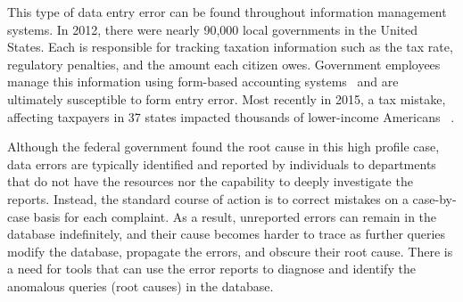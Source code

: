 

This type of data entry error can be found throughout information
management systems. In 2012, there were nearly 90,000 local
governments in the United States. Each is responsible for tracking
taxation information such as the tax rate, regulatory penalties, and
the amount each citizen owes. Government employees manage this
information using form-based accounting
systems~\cite{reutersmanagement} and are ultimately susceptible to
form entry error. Most recently in 2015, a tax mistake, affecting
taxpayers in 37 states impacted thousands of lower-income
Americans~\cite{nyt-tax-article} .

Although the federal government found the root cause in this high
profile case, data errors are typically identified and reported by
individuals to departments that do not have the resources nor the
capability to deeply investigate the reports. Instead, the standard
course of action is to correct mistakes on a case-by-case basis for
each complaint. As a result, unreported errors can remain in the
database indefinitely, and their cause becomes harder to trace as
further queries modify the database, propagate the errors, and obscure
their root cause. There is a need for tools that can use the error
reports to diagnose and identify the anomalous queries (root causes)
in the database.


